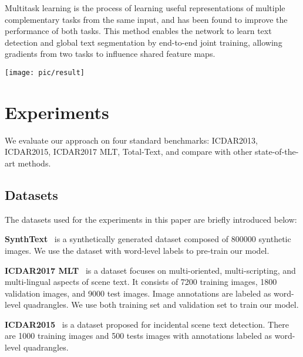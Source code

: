 \documentclass[letterpaper]{article} \usepackage{aaai19}  \usepackage{times}  \usepackage{helvet}  \usepackage{courier}  \usepackage{url}  \usepackage{graphicx}
\begin{document}
\iffalse
Multi-task learning is the process of learning a representation that is useful for multiple complementary tasks from the same input and has been found to improve the performance of both tasks. This method can make network learn both text box detection and global text segmentation in an end-to-end manner, allowing gradients from both tasks to influence a shared feature map.
\fi
Multitask learning is the process of learning useful representations of multiple complementary tasks from the same input, and has been found to improve the performance of both tasks.
This method enables the network to learn text detection and global text segmentation by end-to-end joint training, allowing gradients from two tasks to influence shared feature maps.





\begin{figure*}[ht!]
\centering
\texttt{[image: pic/result]}
\caption{\label{result}{Qualitative results of the proposed algorithm. (a) ICDAR2013. (b) ICDAR2015. (c)ICDAR2017. (d) Total-Text.
}}
\end{figure*}



\section{Experiments}
We evaluate our approach on four standard benchmarks: ICDAR2013, ICDAR2015, ICDAR2017 MLT, Total-Text, and compare with other state-of-the-art methods.
\subsection{Datasets}
The datasets used for the experiments in this paper are briefly introduced below:

\textbf{SynthText}~\cite{gupta2016synthetic} is a synthetically generated dataset composed of 800000 synthetic images. We use the dataset with word-level labels to pre-train our model.


\textbf{ICDAR2017 MLT}~\cite{nayef2017icdar2017} is a dataset focuses on multi-oriented, multi-scripting, and multi-lingual aspects of scene text. It consists of 7200 training images, 1800 validation images, and 9000 test images. Image annotations are labeled as word-level quadrangles. We use both training set and validation set to train our model.

\textbf{ICDAR2015}~\cite{karatzas2015icdar} is a dataset proposed for incidental scene text detection. There are 1000 training images and 500 tests images with annotations labeled as word-level quadrangles.
\end{document}
